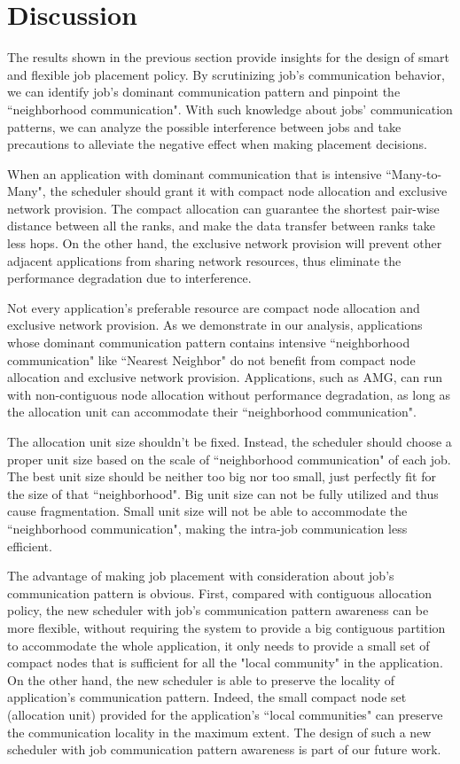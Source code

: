 
\section{Discussion}
\label{sec:discussion}

The results shown in the previous section provide insights 
for the design of smart and flexible job placement policy. 
By scrutinizing job's communication behavior, 
we can identify job's dominant communication pattern 
and pinpoint the ``neighborhood communication". 
With such knowledge about jobs' communication patterns, 
we can analyze the possible interference between jobs and 
take precautions to alleviate the negative effect when making placement decisions. 

When an application with dominant communication that is intensive ``Many-to-Many", 
the scheduler should grant it with compact node allocation and exclusive network provision. 
The compact allocation can guarantee the shortest pair-wise distance between all the ranks, 
and make the data transfer between ranks take less hops. 
On the other hand, 
the exclusive network provision will prevent other adjacent applications from sharing network resources, 
thus eliminate the performance degradation due to interference.

Not every application's preferable resource are compact node allocation 
and exclusive network provision. 
As we demonstrate in our analysis, 
applications whose dominant communication pattern contains intensive 
``neighborhood communication" like ``Nearest Neighbor" do not benefit 
from compact node allocation and exclusive network provision. 
Applications, such as AMG, can run with non-contiguous node 
allocation without performance degradation, 
as long as the allocation unit can accommodate their ``neighborhood communication".

The allocation unit size shouldn't be fixed. 
Instead, the scheduler should choose a proper unit size 
based on the scale of ``neighborhood communication" of each job. 
The best unit size should be neither too big nor too small, 
just perfectly fit for the size of that ``neighborhood". 
Big unit size can not be fully utilized and thus cause fragmentation. 
Small unit size will not be able to accommodate the ``neighborhood communication", 
making the intra-job communication less efficient. 


The advantage of making job placement with consideration about job's communication pattern is obvious. 
First, compared with contiguous allocation policy, 
the new scheduler with job's communication pattern awareness can be more flexible, 
without requiring the system to provide a big contiguous partition to accommodate the whole application, 
it only needs to provide a small set of compact nodes that is 
sufficient for all the "local community" in the application. 
On the other hand, 
the new scheduler is able to preserve the locality of application's communication pattern. 
Indeed, the small compact node set (allocation unit) provided for the application's 
``local communities" can preserve the communication locality in the maximum extent. 
The design of such a new scheduler with job communication pattern awareness 
is part of our future work. 




